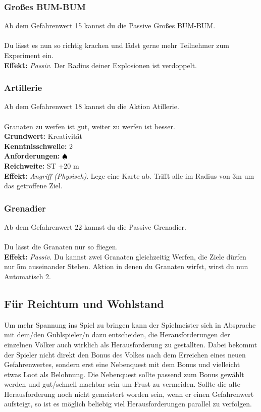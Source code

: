 \subsubsection*{ Großes BUM-BUM} \label{sk:GrosesBUMBUM}
Ab dem Gefahrenwert 15 kannst du die Passive Großes BUM-BUM. \\
\\
Du lässt es nun so richtig krachen und lädst gerne mehr Teilnehmer zum Experiment ein.\\
\textbf{Effekt:} \textit{Passiv.} Der Radius deiner Explosionen ist verdoppelt.

\subsubsection*{ Artillerie} \label{sk:artillerie!}
Ab dem Gefahrenwert 18 kannst du die Aktion Atillerie. \\
\\
Granaten zu werfen ist gut, weiter zu werfen ist besser.\\
\textbf{Grundwert:} Kreativität \\
\textbf{Kenntnisschwelle:} 2 \\
\textbf{Anforderungen:} ${\color{blue} }{\color{black}\spadesuit}$ \\
\textbf{Reichweite:} ST +20 m \\
\textbf{Effekt:} \textit{Angriff (Physisch)}. Lege eine Karte ab. Trifft alle im Radius von 3m um das getroffene Ziel.

\subsubsection*{ Grenadier} \label{sk:Grenafier}
Ab dem Gefahrenwert 22 kannst du die Passive Grenadier. \\
\\
Du lässt die Granaten nur so fliegen.\\
\textbf{Effekt:} \textit{Passiv.} Du kannst zwei Granaten gleichzeitig Werfen, die Ziele dürfen nur 5m auseinander Stehen. Aktion in denen du Granaten wirfst, wirst du nun Automatisch 2.  

\subsection*{Für Reichtum und Wohlstand}
Um mehr Spannung ins Spiel zu bringen kann der Spielmeister sich in Absprache mit dem/den Guhlspieler/n dazu entscheiden, die Herausforderungen der einzelnen Völker auch wirklich als Herausforderung zu gestallten. Dabei bekommt der Spieler nicht direkt den Bonus des Volkes nach dem Erreichen eines neuen Gefahrenwertes, sondern erst eine Nebenquest mit dem Bonus und vielleicht etwas Loot als Belohnung.
Die Nebenquest sollte passend zum Bonus gewählt werden und gut/schnell machbar sein um Frust zu vermeiden. Sollte die alte Herausforderung noch nicht gemeistert worden sein, wenn er einen Gefahrenwert aufsteigt, so ist es möglich beliebig viel Herausforderungen parallel zu verfolgen.

